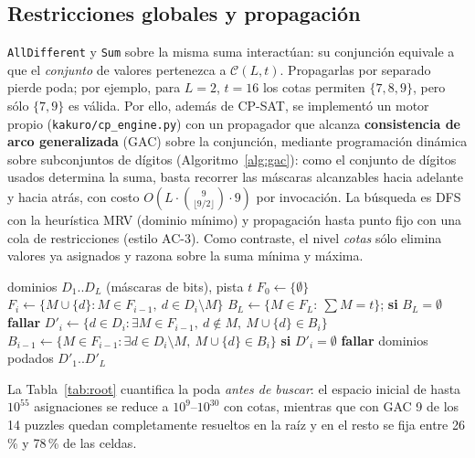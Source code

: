 \documentclass[conference,a4paper]{IEEEtran}\def\HAVEIEEE{1}%
\begin{document}
\subsection{Restricciones globales y propagación}
\texttt{AllDifferent} y \texttt{Sum} sobre la misma suma interactúan: su conjunción equivale a que el \emph{conjunto} de valores pertenezca a $\mathcal{C}(L,t)$. Propagarlas por separado pierde poda; por ejemplo, para $L=2$, $t=16$ los cotas permiten $\{7,8,9\}$, pero sólo $\{7,9\}$ es válida. Por ello, además de CP-SAT, se implementó un motor propio (\texttt{kakuro/cp\_engine.py}) con un propagador que alcanza \textbf{consistencia de arco generalizada} (GAC) sobre la conjunción, mediante programación dinámica sobre subconjuntos de dígitos (Algoritmo~\ref{alg:gac}): como el conjunto de dígitos usados determina la suma, basta recorrer las máscaras alcanzables hacia adelante y hacia atrás, con costo $O(L\cdot\binom{9}{\lfloor 9/2\rfloor}\cdot 9)$ por invocación. La búsqueda es DFS con la heurística MRV (dominio mínimo) y propagación hasta punto fijo con una cola de restricciones (estilo AC-3). Como contraste, el nivel \emph{cotas} sólo elimina valores ya asignados y razona sobre la suma mínima y máxima.

\begin{algorithm}[t]
\caption{GAC para $\texttt{AllDifferent}(x_{1..L})\wedge\sum x_i=t$}\label{alg:gac}
\begin{algorithmic}[1]
\Require dominios $D_1..D_L$ (máscaras de bits), pista $t$
\State $F_0\gets\{\emptyset\}$
 
  \State $F_i\gets\{M\cup\{d\}: M\in F_{i-1},\ d\in D_i\setminus M\}$
\EndFor
\State $B_L\gets\{M\in F_L:\ \sum M=t\}$; \textbf{si} $B_L=\emptyset$ \textbf{fallar}
 
  \State $D'_i\gets\{d\in D_i:\exists M\in F_{i-1},\ d\notin M,\ M\cup\{d\}\in B_i\}$
  \State $B_{i-1}\gets\{M\in F_{i-1}:\exists d\in D_i\setminus M,\ M\cup\{d\}\in B_i\}$
  \State \textbf{si} $D'_i=\emptyset$ \textbf{fallar}
\EndFor
\Ensure dominios podados $D'_1..D'_L$
\end{algorithmic}
\end{algorithm}

La Tabla~\ref{tab:root} cuantifica la poda \emph{antes de buscar}: el espacio inicial de hasta $10^{55}$ asignaciones se reduce a $10^{9}$--$10^{30}$ con cotas, mientras que con GAC 9 de los 14 puzzles quedan completamente resueltos en la raíz y en el resto se fija entre 26\,\% y 78\,\% de las celdas.

\begin{table}[t]
\centering
\caption{Propagación en la raíz: tamaño del espacio de búsqueda ($\log_{10}\prod|D(x_c)|$) antes y después de propagar.}
\label{tab:root}
\small

\end{table}
\end{document}
